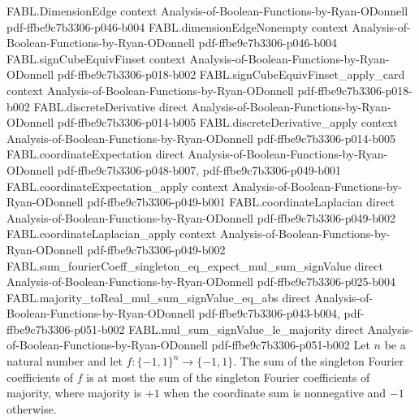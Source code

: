 \begin{theorem}
\proofstep
  {FABL.DimensionEdge}
  {context}
  {Analysis-of-Boolean-Functions-by-Ryan-ODonnell}
  {pdf-ffbe9c7b3306-p046-b004}
\proofstep
  {FABL.dimensionEdgeNonempty}
  {context}
  {Analysis-of-Boolean-Functions-by-Ryan-ODonnell}
  {pdf-ffbe9c7b3306-p046-b004}
\proofstep
  {FABL.signCubeEquivFinset}
  {context}
  {Analysis-of-Boolean-Functions-by-Ryan-ODonnell}
  {pdf-ffbe9c7b3306-p018-b002}
\proofstep
  {FABL.signCubeEquivFinset_apply_card}
  {context}
  {Analysis-of-Boolean-Functions-by-Ryan-ODonnell}
  {pdf-ffbe9c7b3306-p018-b002}
\proofstep
  {FABL.discreteDerivative}
  {direct}
  {Analysis-of-Boolean-Functions-by-Ryan-ODonnell}
  {pdf-ffbe9c7b3306-p014-b005}
\proofstep
  {FABL.discreteDerivative_apply}
  {context}
  {Analysis-of-Boolean-Functions-by-Ryan-ODonnell}
  {pdf-ffbe9c7b3306-p014-b005}
\proofstep
  {FABL.coordinateExpectation}
  {direct}
  {Analysis-of-Boolean-Functions-by-Ryan-ODonnell}
  {pdf-ffbe9c7b3306-p048-b007,
    pdf-ffbe9c7b3306-p049-b001}
\proofstep
  {FABL.coordinateExpectation_apply}
  {context}
  {Analysis-of-Boolean-Functions-by-Ryan-ODonnell}
  {pdf-ffbe9c7b3306-p049-b001}
\proofstep
  {FABL.coordinateLaplacian}
  {direct}
  {Analysis-of-Boolean-Functions-by-Ryan-ODonnell}
  {pdf-ffbe9c7b3306-p049-b002}
\proofstep
  {FABL.coordinateLaplacian_apply}
  {context}
  {Analysis-of-Boolean-Functions-by-Ryan-ODonnell}
  {pdf-ffbe9c7b3306-p049-b002}
\proofstep
  {FABL.sum_fourierCoeff_singleton_eq_expect_mul_sum_signValue}
  {direct}
  {Analysis-of-Boolean-Functions-by-Ryan-ODonnell}
  {pdf-ffbe9c7b3306-p025-b004}
\proofstep
  {FABL.majority_toReal_mul_sum_signValue_eq_abs}
  {direct}
  {Analysis-of-Boolean-Functions-by-Ryan-ODonnell}
  {pdf-ffbe9c7b3306-p043-b004,
    pdf-ffbe9c7b3306-p051-b002}
\proofstep
  {FABL.mul_sum_signValue_le_majority}
  {direct}
  {Analysis-of-Boolean-Functions-by-Ryan-ODonnell}
  {pdf-ffbe9c7b3306-p051-b002}
Let $n$ be a natural number and let $f:\{-1,1\}^n\to\{-1,1\}$. The sum of the singleton
Fourier coefficients of $f$ is at most the sum of the singleton Fourier coefficients of
majority, where majority is $+1$ when the coordinate sum is nonnegative and $-1$
otherwise.
\end{theorem}

